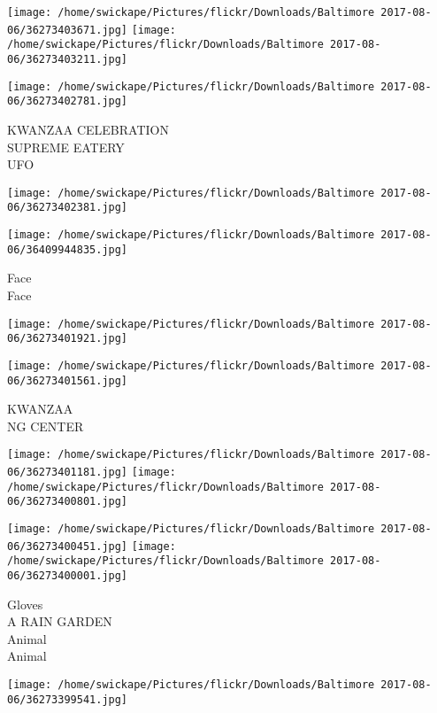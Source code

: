 \documentclass[10pt,letterpaper]{article}
\begin{document}
\texttt{[image: /home/swickape/Pictures/flickr/Downloads/Baltimore 2017-08-06/36273403671.jpg]}
\texttt{[image: /home/swickape/Pictures/flickr/Downloads/Baltimore 2017-08-06/36273403211.jpg]}

\texttt{[image: /home/swickape/Pictures/flickr/Downloads/Baltimore 2017-08-06/36273402781.jpg]}

KWANZAA CELEBRATION\\
SUPREME EATERY\\
UFO\\
\pagebreak

\texttt{[image: /home/swickape/Pictures/flickr/Downloads/Baltimore 2017-08-06/36273402381.jpg]}

\vspace{0.25in}
\texttt{[image: /home/swickape/Pictures/flickr/Downloads/Baltimore 2017-08-06/36409944835.jpg]}

Face\\
Face\\
\pagebreak

\texttt{[image: /home/swickape/Pictures/flickr/Downloads/Baltimore 2017-08-06/36273401921.jpg]}

\vspace{0.25in}
\texttt{[image: /home/swickape/Pictures/flickr/Downloads/Baltimore 2017-08-06/36273401561.jpg]}

KWANZAA\\
NG CENTER\\
\pagebreak

\texttt{[image: /home/swickape/Pictures/flickr/Downloads/Baltimore 2017-08-06/36273401181.jpg]}
\texttt{[image: /home/swickape/Pictures/flickr/Downloads/Baltimore 2017-08-06/36273400801.jpg]}

\texttt{[image: /home/swickape/Pictures/flickr/Downloads/Baltimore 2017-08-06/36273400451.jpg]}
\texttt{[image: /home/swickape/Pictures/flickr/Downloads/Baltimore 2017-08-06/36273400001.jpg]}

Gloves\\
A RAIN GARDEN\\
Animal\\
Animal\\
\pagebreak

\texttt{[image: /home/swickape/Pictures/flickr/Downloads/Baltimore 2017-08-06/36273399541.jpg]}
\end{document}
